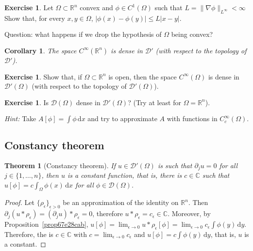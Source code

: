 \documentclass[a4paper,9pt]{amsart}
\newcommand{\scr}[1]{\mathscr{#1}}
\newcommand{\R}{\mathbb{R}}	%
\newcommand{\C}{\mathbb{C}}	%
\newcommand{\did}{\,\mathrm{d}}	%
\newcommand{\de}{\partial}		%
\newcommand{\grad}{\nabla}
\newcommand{\TODO}{{\bf\color{Red}TODO}}
\theoremstyle{plain}
\newtheorem{theorem}[proposition]{Theorem}
\newtheorem{corollary}[proposition]{Corollary}
\theoremstyle{definition}
\newtheorem{exercise}[proposition]{Exercise}%
\theoremstyle{remark}
\begin{document}
\begin{exercise}\label{ex67ea5cf7}
	Let $\Omega\subset\R^n$ convex and $\phi\in C^1(\Omega)$ such that $L = \|\grad\phi\|_{L^\infty}<\infty$
	Show that, for every $x,y\in \Omega$, $|\phi(x)-\phi(y)|\le L|x-y|$.
	
	Question: what happens if we drop the hypothesis of $\Omega$ being convex?
\end{exercise}

\begin{corollary}
	The space $C^\infty(\R^n)$ is dense in $\scr D'$ (with respect to the topology of $\scr D'$).
\end{corollary}


\begin{exercise}
	Show that, if $\Omega\subset\R^n$ is open, then 
	the space $C^\infty(\Omega)$ is dense in $\scr D'(\Omega)$ (with respect to the topology of $\scr D'(\Omega)$).
\end{exercise}

\begin{exercise}
	Is $\scr D(\Omega)$ dense in $\scr D'(\Omega)$? (Try at least for $\Omega=\R^n$).
	
	{\it Hint:}
	Take $A[\phi] = \int \phi\did x$ and try to approximate $A$ with functions in $C^\infty_c(\Omega)$.
\end{exercise}

\subsection{Constancy theorem}\label{subs67df2829}

\begin{theorem}[Constancy theorem]\label{thm68346c5c}
	If $u\in\scr D'(\Omega)$ is such that $\de_ju = 0$ for all $j\in\{1,\dots,n\}$,
	then $u$ is a constant function, that is, there is $c\in\C$ such that $u[\phi] = c\int_\Omega\phi(x)\did x$ for all $\phi\in\scr D(\Omega)$.
\end{theorem}
\begin{proof}
	Let $\{\rho_\epsilon\}_{\epsilon>0}$ be an approximation of the identity on $\R^n$.
	Then $\de_j(u*\rho_\epsilon) = (\de_ju)*\rho_\epsilon = 0$, therefore $u*\rho_\epsilon = c_\epsilon \in\C$.
	Moreover, by Proposition~\ref{prop67e28cab},
	$u[\phi] = \lim_{\epsilon\to0} u*\rho_\epsilon[\phi]
	=  \lim_{\epsilon\to0} c_\epsilon \int \phi(y)\did y$.
	Therefore, the is $c\in\C$ with $c=\lim_{\epsilon\to0} c_\epsilon$ and $u[\phi] = c\int \phi(y)\did y$, that is, $u$ is a constant. 
\end{proof}
\end{document}
